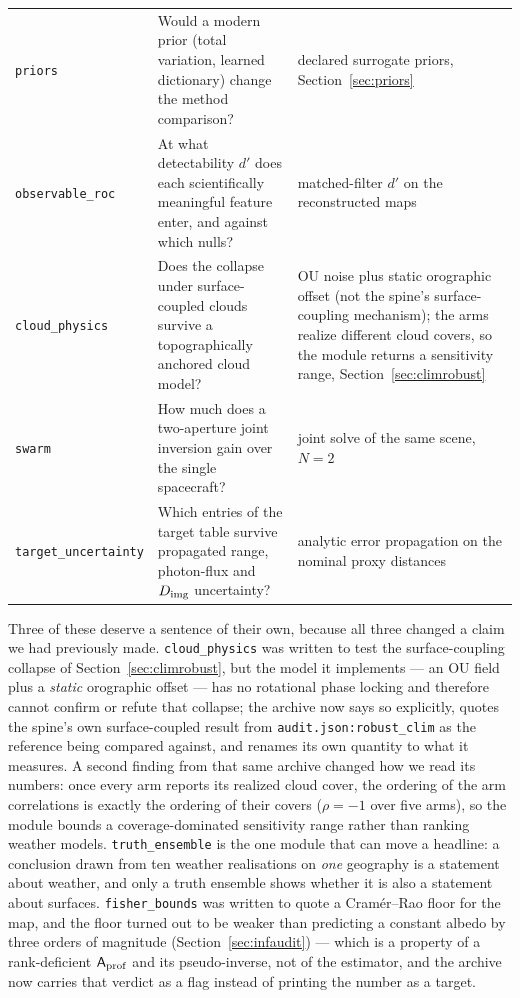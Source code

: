 \documentclass[twocolumn,10pt]{article}
\begin{document}
\begin{table}[t]
\begin{tabular}{p{3.05cm}p{8.0cm}p{3.6cm}}
{\tt priors} & Would a modern prior (total variation, learned dictionary) change
the method comparison? & declared surrogate priors,
Section~\ref{sec:priors} \\
{\tt observable\_roc} & At what detectability $d'$ does each scientifically
meaningful feature enter, and against which nulls? & matched-filter $d'$ on the
reconstructed maps \\
{\tt cloud\_physics} & Does the collapse under surface-coupled clouds survive a
topographically anchored cloud model? & OU noise plus static orographic offset
(not the spine's surface-coupling mechanism); the arms realize different cloud
covers, so the module returns a sensitivity range, Section~\ref{sec:climrobust} \\
{\tt swarm} & How much does a two-aperture joint inversion gain over the single
spacecraft? & joint solve of the same scene, $N=2$ \\
{\tt target\_uncertainty} & Which entries of the target table survive propagated
range, photon-flux and $D_{\rm img}$ uncertainty? & analytic error propagation on
the nominal proxy distances \\
\bottomrule
\end{tabular}
\end{table}

Three of these deserve a sentence of their own, because all three changed a claim
we had previously made. {\tt cloud\_physics} was written to test the
surface-coupling collapse of Section~\ref{sec:climrobust}, but the model it
implements --- an OU field plus a \emph{static} orographic offset --- has no
rotational phase locking and therefore cannot confirm or refute that collapse;
the archive now says so explicitly, quotes the spine's own surface-coupled result
from {\tt audit.json:robust\_clim} as the reference being compared against, and
renames its own quantity to what it measures. A second finding from that same
archive changed how we read its numbers: once every arm reports its realized cloud
cover, the ordering of the arm correlations is exactly the ordering of their
covers ($\rho=-1$ over five arms), so the module bounds a coverage-dominated
sensitivity range rather than ranking weather models. {\tt truth\_ensemble} is the
one
module that can move a headline: a conclusion drawn from ten weather realisations
on \emph{one} geography is a statement about weather, and only a truth ensemble
shows whether it is also a statement about surfaces. {\tt fisher\_bounds} was
written to quote a Cram\'er--Rao floor for the map, and the floor turned out to
be weaker than predicting a constant albedo by three orders of magnitude
(Section~\ref{sec:infaudit}) --- which is a property of a rank-deficient
$\mathsf{A}_{\rm prof}$ and its pseudo-inverse, not of the estimator, and the
archive now carries that verdict as a flag instead of printing the number as a
target.
\end{document}
